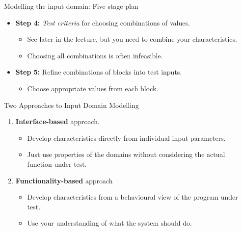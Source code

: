\documentclass{beamer}
\begin{document}
\begin{frame}{Modelling the input domain: Five stage plan}
  \begin{itemize}
  \item {\bf Step 4:} {\it Test criteria} for choosing combinations of values.
    \begin{itemize}
    \item See later in the lecture, but you need to combine your
      characteristics.
    \item Choosing all combinations is often infeasible.
    \end{itemize}
  \item {\bf Step 5:} Refine combinations of blocks into test inputs.
    \begin{itemize}
    \item Choose appropriate values from each block.
    \end{itemize}
  \end{itemize}
\end{frame}
\begin{frame}{Two Approaches to Input Domain Modelling}
  \begin{enumerate}
  \item {\bf Interface-based} approach.
    \begin{itemize}
    \item Develop characteristics directly from individual input
      parameters.
    \item Just use properties of the domains without considering the
      actual function under test.
    \end{itemize}
  \item {\bf Functionality-based} approach
    \begin{itemize}
    \item Develop characteristics from a behavioural view of the
      program under test.
    \item Use your understanding of what the system should do. 
    \end{itemize}
  \end{enumerate}
  
\end{frame}
\end{document}
